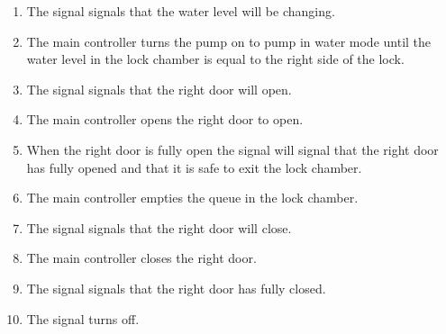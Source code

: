 \documentclass{article}
\begin{document}
\begin{enumerate}
            \item The signal signals that the water level will be changing.
            \item The main controller turns the pump on to pump in water mode until the water level in the lock chamber is equal to the right side of the lock.
            \item The signal signals that the right door will open.
            \item The main controller opens the right door to open.
            \item When the right door is fully open the signal will signal that the right door has fully opened and that it is safe to exit the lock chamber.
            \item The main controller empties the queue in the lock chamber.
            \item The signal signals that the right door will close.
            \item The main controller closes the right door.
            \item The signal signals that the right door has fully closed.
            \item The signal turns off.
        \end{enumerate}
        
        
        
\end{document}
